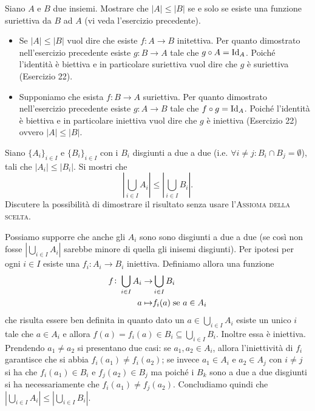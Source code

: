 \begin{es}
  Siano $ A $ e $ B $ due insiemi. Mostrare che $ |A| \leq |B| $ se e solo se esiste una funzione suriettiva da $ B $ ad $ A $ (vi veda l'esercizio precedente).
\end{es}
\begin{itemize}[label = $ \Rightarrow $]
\item Se $ |A| \leq |B| $ vuol dire che esiste $ f \colon A \to B $ initettiva. Per quanto dimostrato nell'esercizio precedente esiste $ g \colon B \to A $ tale che $ g \circ A = \mathrm{Id}_A $. Poiché l'identità è biettiva e in particolare suriettiva vuol dire che $ g $ è suriettiva (Esercizio 22).
\end{itemize}
\begin{itemize}[label = $ \Leftarrow $]
\item Supponiamo che esista $ f \colon B \to A $ suriettiva. Per quanto dimostrato nell'esercizio precedente esiste $ g \colon A \to B $ tale che $ f \circ g = \mathrm{Id}_A $. Poiché l'identità è biettiva e in particolare iniettiva vuol dire che $ g $ è iniettiva (Esercizio 22) ovvero $ |A| \leq |B| $.
\end{itemize}

\begin{es}
  Siano $ \{A_i\}_{i \in I} $ e $ \{B_i\}_{i \in I} $ con i $ B_i $ disgiunti a due a due (i.e. $ \forall i \neq j : B_i \cap B_j = \emptyset $), tali che $ |A_i| \leq |B_i| $. Si mostri che \[\left|\bigcup_{i \in I} A_i\right| \leq \left|\bigcup_{i \in I} B_i\right|.\] Discutere la possibilità di dimostrare il risultato senza usare l'\textsc{Assioma della scelta}.
\end{es}
Possiamo supporre che anche gli $ A_i $ sono sono disgiunti a due a due (se così non fosse $ \left|\bigcup_{i \in I} A_i\right| $ sarebbe minore di quella gli inisemi disgiunti). Per ipotesi per ogni $ i \in I $ esiste una $ f_i \colon A_i \to B_i $ iniettiva. Definiamo allora una funzione
\begin{align*}
  f \colon \bigcup_{i \in I} A_i \to & \bigcup_{i \in I} B_i \\
  a \mapsto & f_i(a) \; \text{se $ a \in A_i $}
\end{align*}
che risulta essere ben definita in quanto dato un $ a \in \bigcup_{i \in I} A_i $ esiste un unico $ i $ tale che $ a \in A_i $ e allora $ f(a) = f_i(a) \in B_i \subseteq \bigcup_{i \in I} B_i $. Inoltre essa è iniettiva. Prendendo $ a_1 \neq a_2 $ si presentano due casi: se $ a_1, a_2 \in A_i $, allora l'iniettività di $ f_i $ garantisce che si abbia $ f_i(a_1) \neq f_i(a_2) $; se invece $ a_1 \in A_i $ e $ a_2 \in A_j $ con $ i \neq j $ si ha che $ f_i(a_1) \in B_i $ e $ f_j(a_2) \in B_j $ ma poiché i $ B_k $ sono a due a due disgiunti si ha necessariamente che $ f_i(a_1) \neq f_j(a_2) $. Concludiamo quindi che $ \left|\bigcup_{i \in I} A_i\right| \leq \left|\bigcup_{i \in I} B_i\right| $.